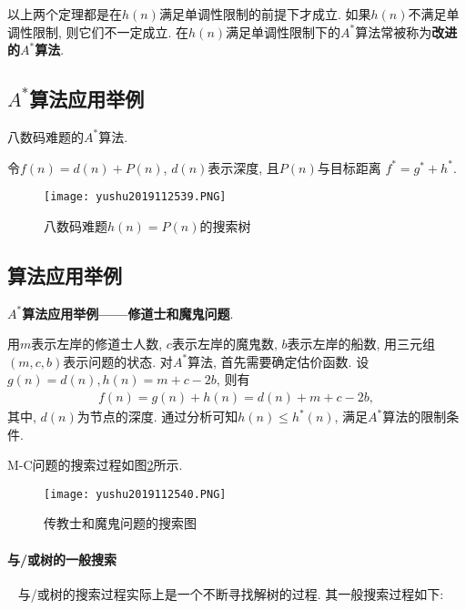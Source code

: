 \begin{remark}
    以上两个定理都是在$h(n)$满足单调性限制的前提下才成立. 如果$h(n)$不满足单调性限制, 则它们不一定成立.
在$h(n)$满足单调性限制下的$A^*$算法常被称为\textbf{改进的$A^*$算法}.
\end{remark}
\subsection{$A^*$算法应用举例}
\begin{example}
    八数码难题的$A^*$算法.
\end{example}
\begin{result}
    令$f(n)=d(n)+P(n)$, $d(n)$表示深度, 且$P(n)$与目标距离 $f^*=g^*+h^*$.
\begin{figure}[H]
    \centering
    \texttt{[image: yushu2019112539.PNG]}
    \caption{八数码难题$h(n)=P(n)$的搜索树}
    \label{AI32fig39}
\end{figure}
\end{result}
\subsection{算法应用举例}
\begin{example}
    \textbf{$A^*$算法应用举例——修道士和魔鬼问题}.
\end{example}
\begin{result}
用$m$表示左岸的修道士人数, $c$表示左岸的魔鬼数, $b$表示左岸的船数, 用三元组$(m, c, b)$表示问题的状态.
对$A^*$算法, 首先需要确定估价函数. 设$g(n)=d(n), h(n)=m+c-2b$, 则有
\begin{align}
    f(n)=g(n)+h(n)=d(n)+m+c-2b,
\end{align}
其中, $d(n)$为节点的深度. 通过分析可知$h(n)\leq h^*(n)$, 满足$A^*$算法的限制条件.
\end{result}

M-C问题的搜索过程如图\ref{AI32fig40}所示.
\begin{figure}[H]
    \centering
    \texttt{[image: yushu2019112540.PNG]}
    \caption{传教士和魔鬼问题的搜索图}
    \label{AI32fig40}
\end{figure}
\paragraph{与/或树的一般搜索}~{}
与/或树的搜索过程实际上是一个不断寻找解树的过程. 其一般搜索过程如下:

